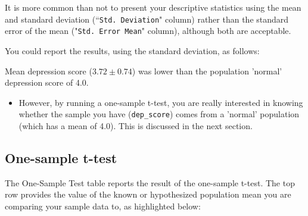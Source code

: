 \documentclass[]{article}
\begin{document}
It is more common than not to present your descriptive statistics using the mean and standard deviation (``\texttt{Std. Deviation}" column) rather than the standard error of the mean ("\texttt{Std. Error Mean}" column), although both are acceptable. 



\begin{framed}
You could report the results, using the standard deviation, as follows:

Mean depression score ($3.72 \pm 0.74$) was lower than the population 'normal' depression score of 4.0.
\end{framed}
\begin{itemize}
\item However, by running a one-sample t-test, you are really interested in knowing whether the sample you have (\texttt{dep\_score}) comes from a 'normal' population (which has a mean of 4.0). This is discussed in the next section.
\end{itemize}
\subsection{One-sample t-test}
The One-Sample Test table reports the result of the one-sample t-test. The top row provides the value of the known or hypothesized population mean you are comparing your sample data to, as highlighted below:
\end{document}
